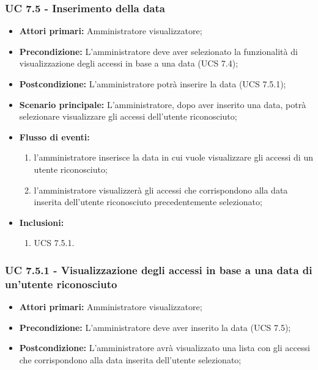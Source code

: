 \subsubsection{UC 7.5 - Inserimento della data }
\begin{itemize}
	\item \textbf{Attori primari:} Amministratore visualizzatore;
	\item \textbf{Precondizione:} L'amministratore deve aver selezionato la funzionalità di visualizzazione degli accessi in base a una data (UCS 7.4);
	\item \textbf{Postcondizione:} L'amministratore potrà inserire la data (UCS 7.5.1);
	\item \textbf{Scenario principale:} L'amministratore, dopo aver inserito una data, potrà selezionare visualizzare gli accessi dell'utente riconosciuto;
	\item \textbf{Flusso di eventi:} 
	\begin{enumerate}
		\item l'amministratore inserisce la data in cui vuole visualizzare gli accessi di un utente riconosciuto;
		\item l'amministratore visualizzerà gli accessi che corrispondono alla data inserita dell'utente riconosciuto precedentemente selezionato;
	\end{enumerate}
	\item \textbf{Inclusioni:}
	\begin{enumerate}
		\item UCS 7.5.1.
	\end{enumerate}
\end{itemize}

\subsubsection{UC 7.5.1 - Visualizzazione degli accessi in base a una data di un'utente riconosciuto }
\begin{itemize}
	\item \textbf{Attori primari:} Amministratore visualizzatore;
	\item \textbf{Precondizione:} L'amministratore deve aver inserito la data (UCS 7.5);
	\item \textbf{Postcondizione:} L'amministratore avrà visualizzato una lista con gli accessi che corrispondono alla data inserita dell'utente selezionato;
\end{itemize}


